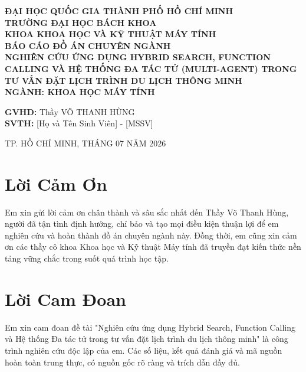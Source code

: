 \documentclass[12pt,a4paper]{report}
\begin{document}
\begin{titlepage}
    \begin{center}
        \large \textbf{ĐẠI HỌC QUỐC GIA THÀNH PHỐ HỒ CHÍ MINH} \\
        \large \textbf{TRƯỜNG ĐẠI HỌC BÁCH KHOA} \\
        \large \textbf{KHOA KHOA HỌC VÀ KỸ THUẬT MÁY TÍNH} \\
        \vspace{3cm}
        \Huge \textbf{BÁO CÁO ĐỒ ÁN CHUYÊN NGÀNH} \\
        \vspace{1.5cm}
        \Large \textbf{NGHIÊN CỨU ỨNG DỤNG HYBRID SEARCH, FUNCTION CALLING VÀ HỆ THỐNG ĐA TÁC TỬ (MULTI-AGENT) TRONG TƯ VẤN ĐẶT LỊCH TRÌNH DU LỊCH THÔNG MINH} \\
        \vspace{2cm}
        \large \textbf{NGÀNH: KHOA HỌC MÁY TÍNH} \\
        \vspace{3cm}
        \begin{flushleft}
            \textbf{GVHD:} Thầy VÕ THANH HÙNG \\
            \textbf{SVTH:} [Họ và Tên Sinh Viên] - [MSSV]
        \end{flushleft}
        \vfill
        \large TP. HỒ CHÍ MINH, THÁNG 07 NĂM 2026
    \end{center}
\end{titlepage}

\chapter*{Lời Cảm Ơn}
Em xin gửi lời cảm ơn chân thành và sâu sắc nhất đến Thầy Võ Thanh Hùng, người đã tận tình định hướng, chỉ bảo và tạo mọi điều kiện thuận lợi để em nghiên cứu và hoàn thành đồ án chuyên ngành này. Đồng thời, em cũng xin cảm ơn các thầy cô khoa Khoa học và Kỹ thuật Máy tính đã truyền đạt kiến thức nền tảng vững chắc trong suốt quá trình học tập.

\chapter*{Lời Cam Đoan}
Em xin cam đoan đề tài "Nghiên cứu ứng dụng Hybrid Search, Function Calling và Hệ thống Đa tác tử trong tư vấn đặt lịch trình du lịch thông minh" là công trình nghiên cứu độc lập của em. Các số liệu, kết quả đánh giá và mã nguồn hoàn toàn trung thực, có nguồn gốc rõ ràng và trích dẫn đầy đủ.
\end{document}
